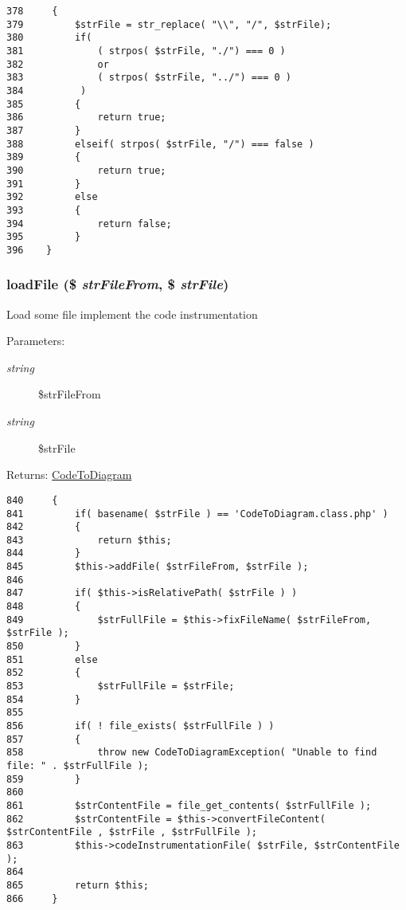 \begin{Code}\begin{verbatim}378     {
379         $strFile = str_replace( "\\", "/", $strFile);
380         if(
381             ( strpos( $strFile, "./") === 0 )
382             or
383             ( strpos( $strFile, "../") === 0 )
384          )
385         {
386             return true;
387         }
388         elseif( strpos( $strFile, "/") === false )
389         {
390             return true;
391         }
392         else
393         {
394             return false;
395         }
396    }
\end{verbatim}
\end{Code}


\hypertarget{class_code_to_diagram_46cc51b5da83819fed739bd1d8b1d2ca}{
\subsubsection[{loadFile}]{\setlength{\rightskip}{0pt plus 5cm}loadFile (\$ {\em strFileFrom}, \/  \$ {\em strFile})}}
\label{class_code_to_diagram_46cc51b5da83819fed739bd1d8b1d2ca}


Load some file implement the code instrumentation

\begin{Desc}
\item[Parameters:]
\begin{description}
\item[{\em string}]\$strFileFrom \item[{\em string}]\$strFile \end{description}
\end{Desc}
\begin{Desc}
\item[Returns:]\hyperlink{class_code_to_diagram}{CodeToDiagram} \end{Desc}


\begin{Code}\begin{verbatim}840     {
841         if( basename( $strFile ) == 'CodeToDiagram.class.php' )
842         {
843             return $this;
844         }
845         $this->addFile( $strFileFrom, $strFile );
846 
847         if( $this->isRelativePath( $strFile ) )
848         {
849             $strFullFile = $this->fixFileName( $strFileFrom, $strFile );
850         }
851         else
852         {
853             $strFullFile = $strFile;
854         }
855 
856         if( ! file_exists( $strFullFile ) )
857         {
858             throw new CodeToDiagramException( "Unable to find file: " . $strFullFile );
859         }
860 
861         $strContentFile = file_get_contents( $strFullFile );
862         $strContentFile = $this->convertFileContent( $strContentFile , $strFile , $strFullFile );
863         $this->codeInstrumentationFile( $strFile, $strContentFile );
864         
865         return $this;
866     }
\end{verbatim}
\end{Code}


